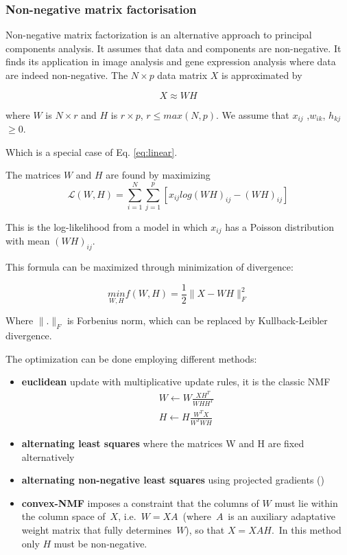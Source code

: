 \documentclass[12pt,]{book}
\providecommand{\tightlist}{%
  \setlength{\itemsep}{0pt}\setlength{\parskip}{0pt}}
\theoremstyle{definition}
\theoremstyle{definition}
\theoremstyle{definition}
\theoremstyle{remark}
\begin{document}
\hypertarget{non-negative-matrix-factorisation}{%
\subsubsection{Non-negative matrix
factorisation}\label{non-negative-matrix-factorisation}}

Non-negative matrix factorization \citep{Seung1999} is an alternative
approach to principal components analysis. It assumes that data and
components are non-negative. It finds its application in image analysis
and gene expression analysis where data are indeed non-negative. The
\(N \times p\) data matrix \(X\) is approximated by

\[X \approx WH \]

where \(W\) is \(N \times r\) and \(H\) is \(r \times p\),
\(r ≤ max(N,p)\). We assume that \(x_{ij}\) ,\(w_{ik}\),
\(h_{kj}\)\(\geq 0\).

Which is a special case of Eq. \eqref{eq:linear}.

The matrices \(W\) and \(H\) are found by maximizing \begin{equation}
\mathcal{L}(W, H) = \sum^N_{i=1}\sum^{p}_{j=1}[x_{ij} log(WH)_{ij} − (WH)_{ij} ] \label{eq:nmf}
\end{equation}

This is the log-likelihood from a model in which \(x_{ij}\) has a
Poisson distribution with mean \((WH)_{ij}\).

This formula can be maximized through minimization of divergence:

\begin{equation}
\underset{W,H}{min} f(W,H)  = \frac{1}{2}\rVert X-WH\rVert^2_F \label{eq:divNMF}
\end{equation}

Where \(\rVert .\rVert_F\) is Forbenius norm, which can be replaced by
Kullback-Leibler divergence.

The optimization can be done employing different methods:

\begin{itemize}
\tightlist
\item
  \textbf{euclidean} update with multiplicative update rules, it is the
  classic NMF \citep{Seung1999}
  \begin{equation}\begin{aligned} W \leftarrow W \frac{XH^T}{WHH^T}\\H \leftarrow H\frac{W^TX}{W^TWH}  \label{eq:euclidNMF} \end{aligned}\end{equation}
\item
  \textbf{alternating least squares} \citep{Paatero1994} where the
  matrices W and H are fixed alternatively
\item
  \textbf{alternating non-negative least squares} using projected
  gradients (\citet{Lin2007})
\item
  \textbf{convex-NMF }\citep{Ding2010} imposes a constraint that the
  columns of \(W\) must lie within the column space of~\(X\),
  i.e.~\(W = XA\)~(where~\(A\)~is an auxiliary adaptative weight matrix
  that fully determines~\(W\)), so that \(X=XAH\).~In this method only
  \(H\) must be non-negative.
\end{itemize}
\end{document}

